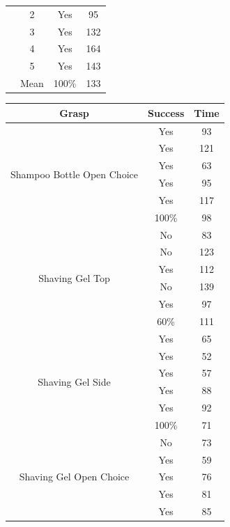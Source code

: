 \begin{table}[ht!]
\begin{minipage}[t]{0.5\textwidth}
\begin{tabular}[t!]{ | c c c c | }
&2 & Yes & 95 \\
&3 & Yes & 132 \\
&4 & Yes & 164 \\
&5 & Yes & 143 \\ 
& Mean & 100\% & 133\\\hline
\end{tabular}
\end{minipage}
\raggedleft
\begin{minipage}[!t]{.4\textwidth}
\begin{tabular}[t!]{ | c c c | }
\hline
Grasp & Success & Time \\ \hline \hline
\multirow{6}{*}{\begin{minipage}[t]{0.2\columnwidth}Shampoo Bottle Open Choice\end{minipage}}& Yes & 93 \\
& Yes & 121 \\
& Yes & 63 \\
& Yes & 95 \\
& Yes & 117 \\ 
& 100\% & 98\\\hline 
\multirow{6}{*}{\begin{minipage}[t]{0.2\columnwidth}Shaving Gel Top\end{minipage}} & No & 83 \\ 
& No & 123 \\ 
& Yes & 112\\
& No & 139 \\
& Yes & 97 \\ 
&  60\% & 111\\\hline 
\multirow{6}{*}{\begin{minipage}[t]{0.2\columnwidth}Shaving Gel Side\end{minipage}} & Yes & 65 \\
& Yes & 52 \\
& Yes & 57 \\
& Yes & 88 \\
& Yes & 92 \\ 
& 100\% & 71\\\hline 
\multirow{6}{*}{\begin{minipage}[t]{0.2\columnwidth}Shaving Gel Open Choice\end{minipage}} & No & 73 \\
& Yes & 59 \\
& Yes & 76 \\
& Yes & 81 \\
& Yes & 85 \\ 

\end{tabular}
\end{minipage}
\end{table}
